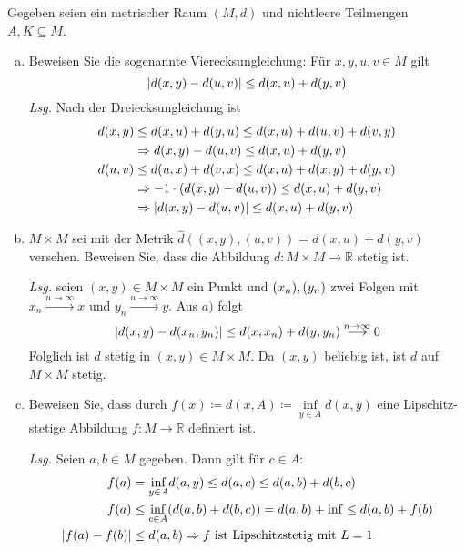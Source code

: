 \documentclass{scrreprt}
\begin{document}
\newpage
\noindent
Gegeben seien ein metrischer Raum $(M, d)$ und nichtleere Teilmengen
$A, K \subseteq M$.
\begin{enumerate}[a)]
\item Beweisen Sie die sogenannte Vierecksungleichung:
  Für $x, y, u, v \in M$ gilt
  \[
    \abs{d(x, y) - d(u, v)} \leq d(x, u) + d(y, v)
  \]
  \textit{Lsg.} Nach der Dreiecksungleichung ist
  \begin{align*}
    d(x, y) &\leq d(x, u) + d(y, u) \leq d(x, u) + d(u, v) + d(v, y) \\
            &\Rightarrow d(x, y) - d(u, v) \leq d(x, u) + d(y, v) \\
    d(u, v) &\leq d(u, x) + d(v, x) \leq d(x, u) + d(x, y) + d(y, v) \\
            &\Rightarrow -1 \cdot (d(x, y) - d(u, v)) \leq d(x, u) + d(y, v) \\
            &\Rightarrow \abs{d(x, y) - d(u, v)} \leq d(x, u) + d(y, v)
  \end{align*}

\item $M \times M$ sei mit der Metrik
  $\hat{d}((x, y), (u, v)) = d(x, u) + d(y, v)$ versehen.
  Beweisen Sie, dass die Abbildung $d \colon M \times M \to \mathbb{R}$
  stetig ist.

  \textit{Lsg.} seien $(x, y) \in M \times M$ ein Punkt und
  $\qty(x_n), \qty(y_n)$ zwei Folgen mit
  $x_n \overset{n \to \infty}\longrightarrow x$ und
  $y_n \overset{n \to \infty}\longrightarrow y$.
  Aus $a)$ folgt
  \[
    \abs{d(x, y) - d(x_n, y_n)} \leq d(x, x_n) + d(y, y_n)
    \overset{n \to \infty}\longrightarrow 0
  \]
  Folglich ist $d$ stetig in $(x, y) \in M \times M$.
  Da $(x, y)$ beliebig ist, ist $d$ auf $M \times M$ stetig.

\item Beweisen Sie, dass durch
  $f(x) \coloneqq d(x, A) \coloneqq \underset{y \in A}\inf d(x, y)$
  eine Lipschitz-stetige Abbildung $f \colon M \to \mathbb{R}$
  definiert ist.

  \textit{Lsg.} Seien $a, b \in M$ gegeben.
  Dann gilt für $c \in A$:
  \begin{align*}
    f(a) &= \underset{y \in A}\inf d(a, y) \leq d(a, c) \leq d(a, b) + d(b, c) \\
    f(a) &\leq \underset{c \in A}\inf \qty(d(a, b) + d(b, c)) = d(a, b) + \inf \leq d(a, b) + f(b) \\
    \abs{f(a) - f(b)} &\leq d(a, b) \Rightarrow f \text{ ist Lipschitzstetig mit $L = 1$}
  \end{align*}


\end{enumerate}
\end{document}
